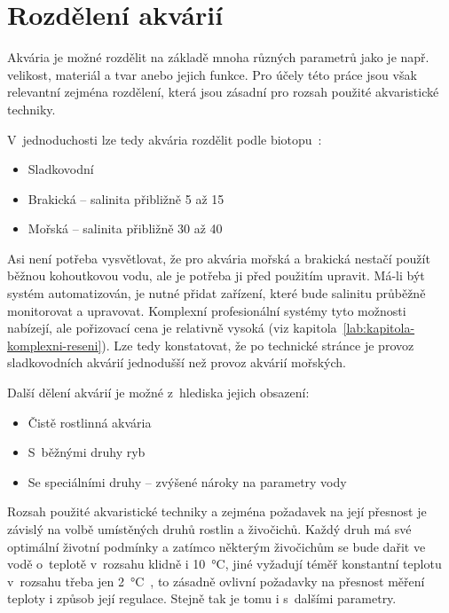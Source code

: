 \section{Rozdělení akvárií}
Akvária je možné rozdělit na základě mnoha různých parametrů jako je např. velikost, materiál a tvar anebo jejich funkce. Pro účely této práce jsou však relevantní zejména rozdělení, která jsou zásadní pro rozsah použité akvaristické techniky. 

V~jednoduchosti lze tedy akvária rozdělit podle biotopu~\cite{haskova_bakalarska2011}:
\begin{itemize}
    \item Sladkovodní
    \item Brakická -- salinita přibližně 5 až \qty{15}{\permille}
    \item Mořská -- salinita přibližně 30 až \qty{40}{\permille}
\end{itemize}

Asi není potřeba vysvětlovat, že pro akvária mořská a brakická nestačí použít běžnou kohoutkovou vodu, ale je potřeba ji před použitím upravit. Má-li být systém automatizován, je nutné přidat zařízení, které bude salinitu průběžně monitorovat a upravovat. Komplexní profesionální systémy tyto možnosti nabízejí, ale pořizovací cena je relativně vysoká (viz kapitola~\ref{lab:kapitola-komplexni-reseni}). Lze tedy konstatovat, že po technické stránce je provoz sladkovodních akvárií jednodušší než provoz akvárií mořských. 

Další dělení akvárií je možné z~hlediska jejich obsazení:
\begin{itemize}
    \item Čistě rostlinná akvária
    \item S~běžnými druhy ryb
    \item Se speciálními druhy -- zvýšené nároky na parametry vody
\end{itemize}
Rozsah použité akvaristické techniky a zejména požadavek na její přesnost je závislý na volbě umístěných druhů rostlin a živočichů. Každý druh má své optimální životní podmínky a zatímco některým živočichům se bude dařit ve vodě o~teplotě v~rozsahu klidně i \qty{10}{\degreeCelsius}, jiné vyžadují téměř konstantní teplotu v~rozsahu třeba jen \qty{2}{\degreeCelsius}~\cite{MusilLibor2018Isps}, to zásadně ovlivní požadavky na přesnost měření teploty i způsob její regulace. Stejně tak je tomu i s~dalšími parametry.
